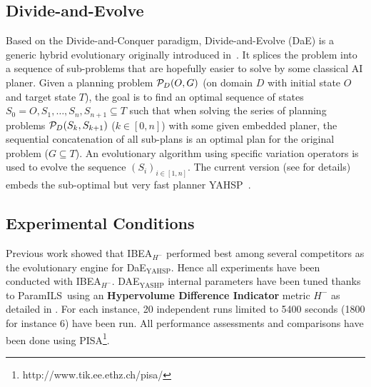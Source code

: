 \documentclass{llncs}
\def\DAE{{\sc DaE}}
\newcommand{\DAEYAHSP}{{\sc DaE$_{\text{YAHSP}}$}}
\def\YAHSP{{\sc YAHSP}}
\def\PARAMILS{{\sc ParamILS}}
\begin{document}
\subsection{Divide-and-Evolve}
\label{sec:dae}

Based on the Divide-and-Conquer paradigm, Divide-and-Evolve (\DAE) is a generic hybrid evolutionary originally introduced in~\cite{Schoenauer2006}.   
It splices the problem into a sequence of sub-problems that are hopefully easier to solve by some classical AI planer.
Given a planning problem  ${\cal P}_D(O,G)$ (on domain $D$ with initial state $O$ and target state $T$), the goal is to find an optimal sequence of states $S_0=O, S_1, \ldots, S_n, S_{n+1} \subseteq T$ such that when solving the series of planning problems ${\cal P}_D(S_{k},S_{k+1})$ ($k \in [0,n]$) with some given embedded planer, the sequential concatenation of all sub-plans is an optimal plan for the original problem ($G \subseteq T$). An evolutionary algorithm using specific variation operators is used to evolve the  sequence $(S_i)_{i \in [1,n]}$. The current version (see \cite{Bibai2010} for details) embeds the sub-optimal but very fast planner \YAHSP~\cite{Vidal2004}.


\subsection{Experimental Conditions}

Previous work \cite{khouadjia:hal-00750560} showed that IBEA$_{H^-}$ performed best among several competitors as the evolutionary engine for \DAEYAHSP. Hence all experiments have been conducted with IBEA$_{H^-}$. DAE$_{\text{YASHP}}$ internal parameters have been tuned thanks to \PARAMILS\ using an {\bf Hypervolume Difference Indicator} metric $H^-$ as detailed in \cite{khouadjia:hal-00820634}. For each instance, 20 independent runs limited to 5400 seconds (1800 for instance 6) have been run. All performance assessments and comparisons have been done using PISA\footnote{http://www.tik.ee.ethz.ch/pisa/}. %
\end{document}
